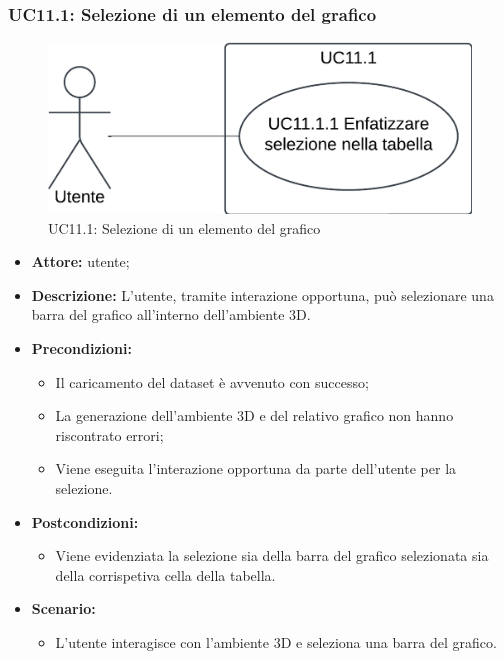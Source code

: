 \pagebreak

\subsubsection{UC11.1: Selezione di un elemento del grafico}
\begin{figure}[h!]\centering
    \includegraphics[scale=0.7]{template/images/UC11.1.png}
    \caption{UC11.1: Selezione di un elemento del grafico}
\end{figure}
\begin{itemize}    
    \item \textbf{Attore:} utente;
    \item \textbf{Descrizione:} L'utente, tramite interazione opportuna, può selezionare una barra del grafico all'interno dell'ambiente 3D.
    \item \textbf{Precondizioni:}    
        \begin{itemize}
            \item Il caricamento del dataset è avvenuto con successo;
            \item La generazione dell'ambiente 3D e del relativo grafico non hanno riscontrato errori;
            \item Viene eseguita l'interazione opportuna da parte dell'utente per la selezione.
        \end{itemize}    
    \item \textbf{Postcondizioni:}
        \begin{itemize}
            \item Viene evidenziata la selezione sia della barra del grafico selezionata sia della corrispetiva cella della tabella.
        \end{itemize}    
    \item \textbf{Scenario:} 
        \begin{itemize}
            \item L'utente interagisce con l'ambiente 3D e seleziona una barra del grafico.
        \end{itemize}
\end{itemize}
